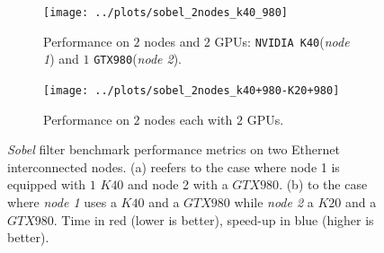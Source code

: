 \begin{figure}[!htb]
	\begin{subfigure}{1.0\textwidth}
		\caption{Performance on $2$ nodes and $2$ GPUs: \texttt{NVIDIA K40}(\textit{node 1}) and $1$ \texttt{GTX980}(\textit{node 2}).}
		\label{fig:sobel_2nodes_k40_980}
		\texttt{[image: ../plots/sobel\_2nodes\_k40\_980]}
		
	\end{subfigure}        
	\endminipage \hfill
	\vspace{5mm}
	\begin{subfigure}{1.0\textwidth}
		\texttt{[image: ../plots/sobel\_2nodes\_k40+980-K20+980]}
		\caption{Performance on $2$ nodes each with $2$ GPUs.}
		\label{fig:sobel_2nodes_k40+980-K20+980}
	\end{subfigure}
	\endminipage\hfill
	\caption[\textit{Sobel} filter benchmark performance metrics on two nodes.]{\textit{Sobel} filter benchmark performance metrics on two Ethernet interconnected nodes. (a) reefers to the case where node 1 is equipped with $1$ $K40$ and node 2 with a $GTX980$. (b) to the case where \textit{node 1} uses a $K40$ and a $GTX980$ while \textit{node 2} a $K20$ and a $GTX980$. Time in red (lower is better), speed-up in blue (higher is better).}
	\label{fig:sobel_2nodes_performance}
\end{figure}
